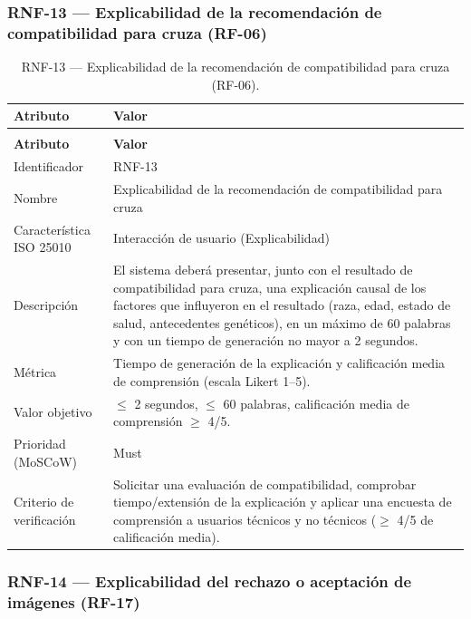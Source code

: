 \documentclass[journal,onecolumn]{IEEEtran}
\makeatletter
\newenvironment{atributos}[2]{%
	\small
	\begin{longtable}{@{}>{\raggedright\arraybackslash}p{4.2cm} >{\raggedright\arraybackslash}p{11.2cm}@{}}
		\caption{#2}\label{tab:#1}\\
		\toprule
		\textbf{Atributo} & \textbf{Valor} \\
		\midrule
		\endfirsthead
		\multicolumn{2}{@{}l}{\small\itshape (continuación)}\\
		\toprule
		\textbf{Atributo} & \textbf{Valor} \\
		\midrule
		\endhead
		\bottomrule
		\endlastfoot
	}{%
	\end{longtable}
	\normalsize
}
\makeatother
\begin{document}
	\subsubsection{RNF-13 --- Explicabilidad de la recomendación de compatibilidad para cruza (RF-06)}
	
	\begin{atributos}{RNF-13}{RNF-13 --- Explicabilidad de la recomendación de compatibilidad para cruza (RF-06).}
		Identificador & RNF-13 \\
		Nombre & Explicabilidad de la recomendación de compatibilidad para cruza \\
		Característica ISO 25010 & Interacción de usuario (Explicabilidad) \\
		Descripción & El sistema deberá presentar, junto con el resultado de compatibilidad para cruza, una explicación causal de los factores que influyeron en el resultado (raza, edad, estado de salud, antecedentes genéticos), en un máximo de 60 palabras y con un tiempo de generación no mayor a 2 segundos. \\
		Métrica & Tiempo de generación de la explicación y calificación media de comprensión (escala Likert 1--5). \\
		Valor objetivo & $\leq$ 2 segundos, $\leq$ 60 palabras, calificación media de comprensión $\geq$ 4/5. \\
		Prioridad (MoSCoW) & Must \\
		Criterio de verificación & Solicitar una evaluación de compatibilidad, comprobar tiempo/extensión de la explicación y aplicar una encuesta de comprensión a usuarios técnicos y no técnicos ($\geq$ 4/5 de calificación media). \\
	\end{atributos}
	
	\subsubsection{RNF-14 --- Explicabilidad del rechazo o aceptación de imágenes (RF-17)}
	
\end{document}
